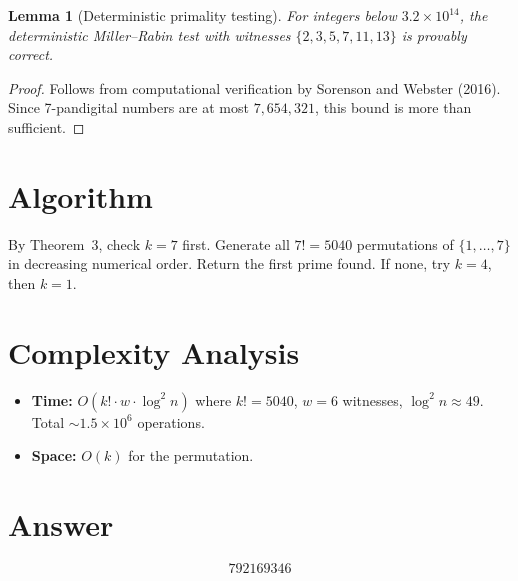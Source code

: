 \documentclass[11pt]{article}
\newtheorem{lemma}[theorem]{Lemma}
\theoremstyle{definition}
\begin{document}
\begin{lemma}[Deterministic primality testing]
For integers below $3.2 \times 10^{14}$, the deterministic Miller--Rabin test with witnesses $\{2, 3, 5, 7, 11, 13\}$ is provably correct.
\end{lemma}

\begin{proof}
Follows from computational verification by Sorenson and Webster (2016). Since 7-pandigital numbers are at most $7{,}654{,}321$, this bound is more than sufficient.
\end{proof}

\section{Algorithm}

By Theorem~3, check $k = 7$ first. Generate all $7! = 5040$ permutations of $\{1,\ldots,7\}$ in decreasing numerical order. Return the first prime found. If none, try $k = 4$, then $k = 1$.

\section{Complexity Analysis}

\begin{itemize}
\item \textbf{Time:} $O(k! \cdot w \cdot \log^2 n)$ where $k! = 5040$, $w = 6$ witnesses, $\log^2 n \approx 49$. Total $\sim 1.5 \times 10^6$ operations.
\item \textbf{Space:} $O(k)$ for the permutation.
\end{itemize}

\section{Answer}

\[
\boxed{792169346}
\]
\end{document}
